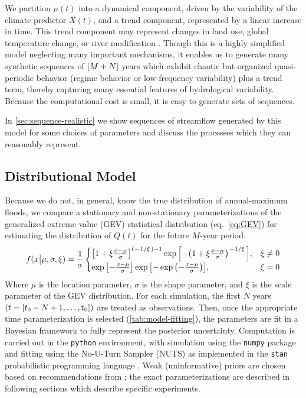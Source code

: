 \documentclass[12pt]{article}
\begin{document}
We partition \( \mu(t) \) into a dynamical component, driven by the variability of the climate predictor \(X(t)\), and a trend component, represented by a linear increase in time.
This trend component may represent changes in land use, global temperature change, or river modification \citep[see][]{Merz2014}.
Though this is a highly simplified model neglecting many important mechanisms, it enables us to generate many synthetic sequences of \(\qty[M + N]\) years which exhibit chaotic but organized quasi-periodic behavior (regime behavior or low-frequency variability) plus a trend term, thereby capturing many essential features of hydrological variability.
Because the computational cost is small, it is easy to generate sets of sequences.

In \cref{sec:sequence-realistic} we show sequences of streamflow generated by this model for some choices of parameters and discuss the processes which they can reasonably represent.

\subsection{Distributional Model\label{sec:estimation}}

Because we do not, in general, know the true distribution of annual-maximum floods, we compare a stationary and non-stationary parameterizations of the generalized extreme value (GEV) statistical distribution (eq.~\ref{eq:GEV}) for estimating the distribution of \(Q(t)\) for the future \(M\)-year period.
\begin{equation}
  \label{eq:GEV}
  f(x \big| \mu, \sigma, \xi) = \frac{1}{\sigma}
    \begin{cases}
      \qty[1 + \xi \frac{x - \mu}{\sigma}] ^ {(-\flatfrac{1}{\xi})-1} \exp \qty[-\qty(1+\xi \frac{x - \mu}{\sigma})^{\flatfrac{-1}{\xi}}], & \xi \neq 0 \\
      \exp \qty[-\frac{x-\mu}{\sigma}] \exp \qty[- \exp \qty(- \frac{x-\mu}{\sigma})], & \xi = 0
    \end{cases}
\end{equation}
Where \(\mu{}\) is the location parameter, \(\sigma{}\) is the shape parameter, and \(\xi{}\) is the scale parameter of the GEV distribution.
For each simulation, the first \(N\) years \(\qty(t=[t_0-N+1, \ldots, t_0])\) are treated as observations.
Then, once the appropriate time parameterization is selected (\cref{tab:model-fitting}), the parameters are fit in a Bayesian framework to fully represent the posterior uncertainty.
Computation is carried out in the \texttt{python} environment, with simulation using the \texttt{numpy} package \citep{vanderWalt2011} and fitting using the No-U-Turn Sampler (NUTS) \citep{Hoffman2014} as implemented in the \texttt{stan} probabilistic programming language \citep{Carpenter2016}.
Weak (uninformative) priors are chosen based on recommendations from \citet{Martins2000}; the exact parameterizations are described in following sections which describe specific experiments.
\end{document}
